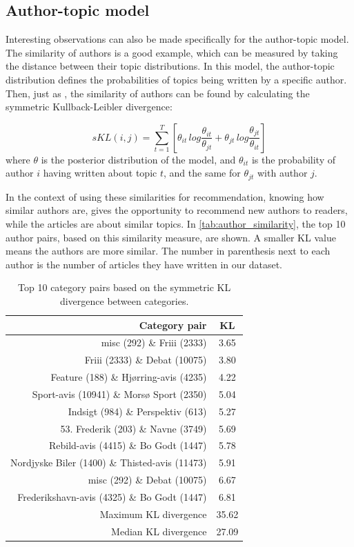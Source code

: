 \subsection{Author-topic model}\label{sec:discussion_author_topic}
Interesting observations can also be made specifically for the author-topic model.
The similarity of authors is a good example, which can be measured by taking the distance between their topic distributions.
In this model, the author-topic distribution defines the probabilities of topics being written by a specific author.
Then, just as \citet{author_topic_2012}, the similarity of authors can be found by calculating the symmetric Kullback-Leibler divergence:

\begin{equation} \label{eq:author_similarity}
	sKL(i,j) = \sum_{t=1}^{T}\left[\theta_{it}\, log \frac{\theta_{it}}{\theta_{jt}} + \theta_{jt}\, log \frac{\theta_{jt}}{\theta_{it}}\right]
\end{equation}
\noindent where $\theta$ is the posterior distribution of the model, and $\theta_{it}$ is the probability of author $i$ having written about topic $t$, and the same for $\theta_{jt}$ with author $j$.

In the context of using these similarities for recommendation, knowing how similar authors are, gives the opportunity to recommend new authors to readers, while the articles are about similar topics.
In \autoref{tab:author_similarity}, the top 10 author pairs, based on this similarity measure, are shown.
A smaller KL value means the authors are more similar.
The number in parenthesis next to each author is the number of articles they have written in our dataset.


\begin{table}[t]
	\centering
	\caption{Top 10 category pairs based on the symmetric KL divergence between categories.}
	\begin{tabular}{r|c}
		Category pair & KL \\
		\midrule
		misc (292) \& Friii (2333) & 3.65 \\
		Friii (2333) \& Debat (10075) & 3.80 \\
		Feature (188) \& Hjørring-avis (4235) & 4.22 \\
		Sport-avis (10941) \& Morsø Sport (2350) & 5.04 \\
		Indsigt (984) \& Perspektiv (613) & 5.27 \\
		53. Frederik (203) \& Navne (3749) & 5.69 \\
		Rebild-avis (4415) \& Bo Godt (1447) & 5.78 \\
		Nordjyske Biler (1400) \& Thisted-avis (11473) & 5.91 \\
		misc (292) \& Debat (10075) & 6.67 \\
		Frederikshavn-avis (4325) \& Bo Godt (1447) & 6.81 \\
		\midrule
		Maximum KL divergence & 35.62 \\
		Median KL divergence & 27.09 \\
	\end{tabular}
	\label{tab:category_similarity}
\end{table}

